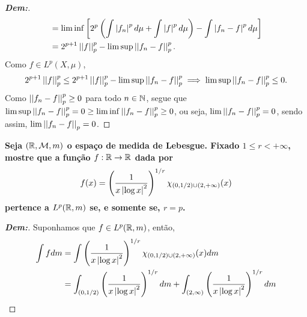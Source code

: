 \begin{proof}[\textbf{Dem:}]
\begin{align*}
    &= \lim \inf \cparth{2^p \parth{\int \mparth{f_n}^p d\mu + \int \mparth{f}^p d\mu}
    - \int \mparth{f_n - f}^p d\mu}\\
    &= 2^{p + 1} \pnorm p f^p - \lim\sup \pnorm p {f_n - f}^p. 
  \end{align*}
  Como $f \in L^p(X, \mu)$, 
  \begin{align*}
    2^{p+1}\pnorm p f^p \le 2^{p+1}\pnorm p f^p - \lim \sup \pnorm p {f_n - f}^p \implies
    \lim \sup \pnorm p {f_n - f}^p \le 0.
  \end{align*}
  Como $\pnorm p {f_n - f}^p \ge 0$ para todo $n \in \bN$, segue que 
  $\lim \sup \pnorm p {f_n - f}^p = 0 \ge \lim \inf \pnorm p {f_n - f}^p \ge 0$, 
  ou seja, $\lim \pnorm p {f_n - f}^p = 0$, sendo assim, $\lim \pnorm p {f_n - f} = 0$.
\end{proof}

\textbf{Seja $(\bR, \mcal M, m)$ o espaço de medida de Lebesgue. Fixado $1 \le r < +\infty$, 
mostre que a função $f: \bR \rightarrow \bR$ dada por 
\begin{align*}
  f(x) = \parth{\frac{1}{x\mparth{\log x}^2}}^{1/r} \chi_{(0, 1/2) \cup (2, +\infty)}(x)
\end{align*}
pertence a $L^p(\bR, m)$ se, e somente se, $r=p$.}
\begin{proof}[\textbf{Dem:}]
  Suponhamos que $f \in L^p(\bR, m)$, então, 
  \begin{align*}
    \int f dm &= \int \parth{\frac{1}{x\mparth{\log x}^2}}^{1/r} 
    \chi_{(0, 1/2) \cup (2, +\infty)}(x) dm \\
    &= \int_{(0, 1/2)} \parth{\frac{1}{x\mparth{\log x}^2}}^{1/r}dm
    + \int_{(2, \infty)} \parth{\frac{1}{x\mparth{\log x}^2}}^{1/r} dm
  \end{align*}
\end{proof}

